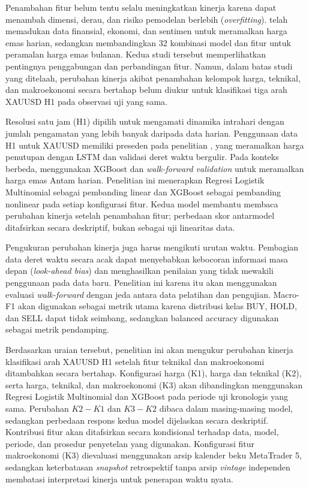 Penambahan fitur belum tentu selalu meningkatkan kinerja karena dapat menambah dimensi, derau, dan risiko pemodelan berlebih (\emph{overfitting}). \textcite{taneva2025framework} telah memadukan data finansial, ekonomi, dan sentimen untuk meramalkan harga emas harian, sedangkan \textcite{velez2026predictive} membandingkan 32 kombinasi model dan fitur untuk peramalan harga emas bulanan. Kedua studi tersebut memperlihatkan pentingnya penggabungan dan perbandingan fitur. Namun, dalam batas studi yang ditelaah, perubahan kinerja akibat penambahan kelompok harga, teknikal, dan makroekonomi secara bertahap belum diukur untuk klasifikasi tiga arah XAUUSD H1 pada observasi uji yang sama.

Resolusi satu jam (H1) dipilih untuk mengamati dinamika intrahari dengan jumlah pengamatan yang lebih banyak daripada data harian. Penggunaan data H1 untuk XAUUSD memiliki preseden pada penelitian \textcite{arif2026multivariate}, yang meramalkan harga penutupan dengan LSTM dan validasi deret waktu bergulir. Pada konteks berbeda, \textcite{hisyam2025implementasi} menggunakan XGBoost dan \emph{walk-forward validation} untuk meramalkan harga emas Antam harian. Penelitian ini menerapkan Regresi Logistik Multinomial sebagai pembanding linear dan XGBoost sebagai pembanding nonlinear pada setiap konfigurasi fitur. Kedua model membantu membaca perubahan kinerja setelah penambahan fitur; perbedaan skor antarmodel ditafsirkan secara deskriptif, bukan sebagai uji linearitas data.

Pengukuran perubahan kinerja juga harus mengikuti urutan waktu. Pembagian data deret waktu secara acak dapat menyebabkan kebocoran informasi masa depan (\emph{look-ahead bias}) dan menghasilkan penilaian yang tidak mewakili penggunaan pada data baru. Penelitian ini karena itu akan menggunakan evaluasi \emph{walk-forward} dengan jeda antara data pelatihan dan pengujian. Macro-F1 akan digunakan sebagai metrik utama karena distribusi kelas BUY, HOLD, dan SELL dapat tidak seimbang, sedangkan balanced accuracy digunakan sebagai metrik pendamping.

Berdasarkan uraian tersebut, penelitian ini akan mengukur perubahan kinerja klasifikasi arah XAUUSD H1 setelah fitur teknikal dan makroekonomi ditambahkan secara bertahap. Konfigurasi harga (K1), harga dan teknikal (K2), serta harga, teknikal, dan makroekonomi (K3) akan dibandingkan menggunakan Regresi Logistik Multinomial dan XGBoost pada periode uji kronologis yang sama. Perubahan $K2-K1$ dan $K3-K2$ dibaca dalam masing-masing model, sedangkan perbedaan respons kedua model dijelaskan secara deskriptif. Kontribusi fitur akan ditafsirkan secara kondisional terhadap data, model, periode, dan prosedur penyetelan yang digunakan. Konfigurasi fitur makroekonomi (K3) dievaluasi menggunakan arsip kalender beku MetaTrader 5, sedangkan keterbatasan \emph{snapshot} retrospektif tanpa arsip \emph{vintage} independen membatasi interpretasi kinerja untuk penerapan waktu nyata.

